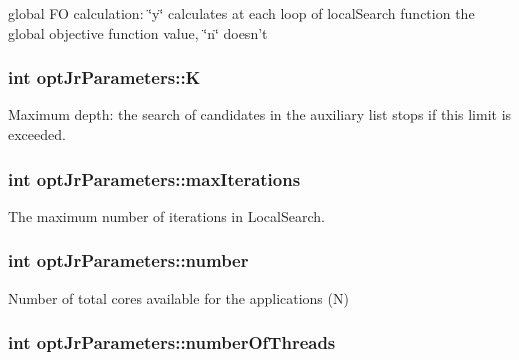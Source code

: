 global F\-O calculation\-: \char`\"{}y\char`\"{} calculates at each loop of local\-Search function the global objective function value, \char`\"{}n\char`\"{} doesn't 

\hypertarget{classoptJrParameters_a8943dcfa48e368831ec28c9d1f5a953d}{
\subsubsection[{K}]{\setlength{\rightskip}{0pt plus 5cm}int opt\-Jr\-Parameters\-::\-K\hspace{0.3cm}{\ttfamily [private]}}}\label{classoptJrParameters_a8943dcfa48e368831ec28c9d1f5a953d}


Maximum depth\-: the search of candidates in the auxiliary list stops if this limit is exceeded. 

\hypertarget{classoptJrParameters_af1f1ee05cb0a9962182b9330c7e9536b}{
\subsubsection[{max\-Iterations}]{\setlength{\rightskip}{0pt plus 5cm}int opt\-Jr\-Parameters\-::max\-Iterations\hspace{0.3cm}{\ttfamily [private]}}}\label{classoptJrParameters_af1f1ee05cb0a9962182b9330c7e9536b}


The maximum number of iterations in Local\-Search. 

\hypertarget{classoptJrParameters_a9d99c995ae7815448131832e13b7c723}{
\subsubsection[{number}]{\setlength{\rightskip}{0pt plus 5cm}int opt\-Jr\-Parameters\-::number\hspace{0.3cm}{\ttfamily [private]}}}\label{classoptJrParameters_a9d99c995ae7815448131832e13b7c723}


Number of total cores available for the applications (N) 

\hypertarget{classoptJrParameters_a7748d7ba51ef897423d145f2e33273d8}{
\subsubsection[{number\-Of\-Threads}]{\setlength{\rightskip}{0pt plus 5cm}int opt\-Jr\-Parameters\-::number\-Of\-Threads\hspace{0.3cm}{\ttfamily [private]}}}\label{classoptJrParameters_a7748d7ba51ef897423d145f2e33273d8}


